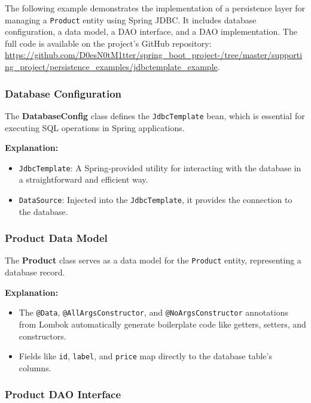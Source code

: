 \documentclass{article}
\begin{document}
The following example demonstrates the implementation of a persistence layer for managing a \texttt{Product} entity using Spring JDBC. It includes database configuration, a data model, a DAO interface, and a DAO implementation. The full code is available on the project's GitHub repository: \\ \url{https://github.com/D0esN0tM1tter/spring_boot_project-/tree/master/supporting_project/persistence_examples/jdbctemplate_example}.

\subsubsection{Database Configuration}

The \textbf{DatabaseConfig} class defines the \texttt{JdbcTemplate} bean, which is essential for executing SQL operations in Spring applications.

\textbf{Explanation:}
\begin{itemize}
    \item \texttt{JdbcTemplate}: A Spring-provided utility for interacting with the database in a straightforward and efficient way.
    \item \texttt{DataSource}: Injected into the \texttt{JdbcTemplate}, it provides the connection to the database.
\end{itemize}

\subsubsection{Product Data Model}

The \textbf{Product} class serves as a data model for the \texttt{Product} entity, representing a database record.

\textbf{Explanation:}
\begin{itemize}
    \item The \texttt{@Data}, \texttt{@AllArgsConstructor}, and \texttt{@NoArgsConstructor} annotations from Lombok automatically generate boilerplate code like getters, setters, and constructors.
    \item Fields like \texttt{id}, \texttt{label}, and \texttt{price} map directly to the database table's columns.
\end{itemize}

\subsubsection{Product DAO Interface}
\end{document}
